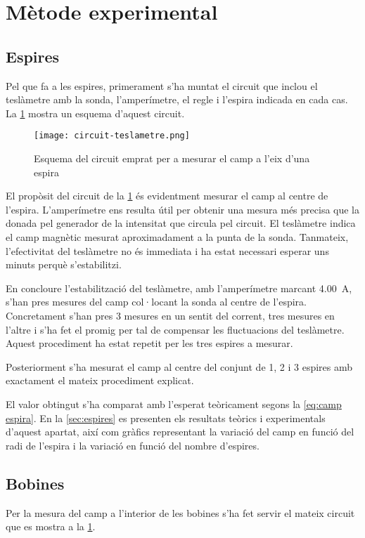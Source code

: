 \section{Mètode experimental}
\subsection{Espires}
Pel que fa a les espires, primerament s'ha muntat el circuit que inclou el teslàmetre amb la sonda, l'amperímetre, el regle i l'espira indicada en cada cas. La \cref{fig:circuit teslametre} mostra un esquema d'aquest circuit.

\begin{figure}[htb]
  \centering \small \sffamily
  \texttt{[image: circuit-teslametre.png]}
  \caption{Esquema del circuit emprat per a mesurar el camp a l'eix d'una espira}
  \label{fig:circuit teslametre}
\end{figure}

El propòsit del circuit de la \cref{fig:circuit teslametre} és evidentment mesurar el camp al centre de l'espira. L'amperímetre ens resulta útil per obtenir una mesura més precisa que la donada pel generador de la intensitat que circula pel circuit. El teslàmetre indica el camp magnètic mesurat aproximadament a la punta de la sonda. Tanmateix, l'efectivitat del teslàmetre no és immediata i ha estat necessari esperar uns minuts perquè s'estabilitzi.

En concloure l'estabilització del teslàmetre, amb l'amperímetre marcant \SI{4.00}{A}, s'han pres mesures del camp col·locant la sonda al centre de l'espira. Concretament s'han pres 3 mesures en un sentit del corrent, tres mesures en l'altre i s'ha fet el promig per tal de compensar les fluctuacions del teslàmetre. Aquest procediment ha estat repetit per les tres espires a mesurar.

Posteriorment s'ha mesurat el camp al centre del conjunt de 1, 2 i 3 espires amb exactament el mateix procediment explicat.

El valor obtingut s'ha comparat amb l'esperat teòricament segons la \cref{eq:camp espira}. En la \cref{sec:espires} es presenten els resultats teòrics i experimentals d'aquest apartat, així com gràfics representant la variació del camp en funció del radi de l'espira i la variació en funció del nombre d'espires.

\subsection{Bobines}
Per la mesura del camp a l'interior de les bobines s'ha fet servir el mateix circuit que es mostra a la \cref{fig:circuit teslametre}.


